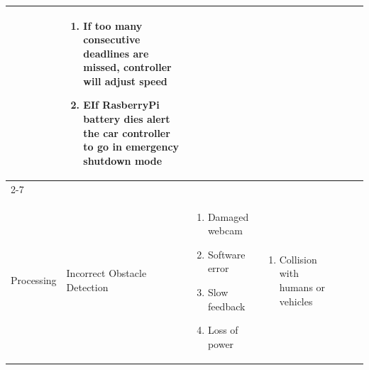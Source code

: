 \documentclass [10pt]{article}
\begin{document}
{\begin{minipage}{\textwidth}
\begin{longtable}{ |p{ }  | p{ } |  p{ } |  p{ } | p{ } | p{ } |  p{ }|}
    
    & \cellcolor{tableCell}\begin{minipage}{.24 \columnwidth} 
                \vspace{2mm}
                \begin{enumerate}
                    \item If too many consecutive deadlines are missed, controller will adjust speed
                    \item EIf RasberryPi battery dies alert the car controller to go in emergency shutdown mode\vspace {1mm}
                \end{enumerate}
        \end{minipage} \\ \cline{2-7}
    
    \multirow{-8}{*}{\begin{minipage} {.12\columnwidth}
    \begin{center}Image \\Processing \end{center}
    \end{minipage} \cellcolor{subsectionC} }
    & \begin{minipage} {.19\columnwidth}
            \begin{center}Incorrect  Obstacle Detection \end{center}
        \end{minipage} 
    & \begin{minipage}{.22\textwidth} 
                \begin{enumerate}
                    \item Damaged webcam
                    \item Software error
                    \item Slow feedback 
                    \item Loss of power\vspace {1mm}
                \end{enumerate}
        \end{minipage}
    & \begin{minipage}{.22\textwidth} 
                \vspace{2mm}
                \begin{enumerate}
                    \item Collision with humans or vehicles\vspace {1mm}
                \end{enumerate}
        \end{minipage}
    & \begin{minipage}{.18\textwidth} 

\end{minipage}
\end{longtable}
\end{minipage}}
\end{document}
